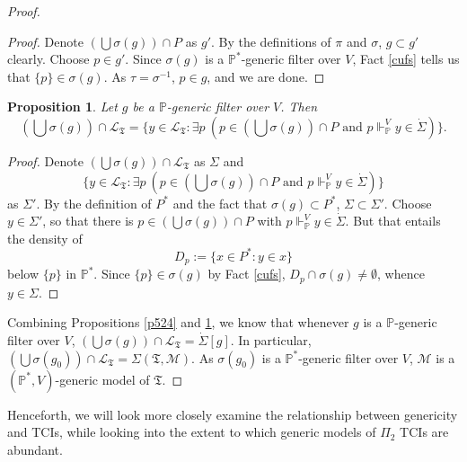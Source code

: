 \documentclass[12pt, twoside]{memoir}
\numberwithin{equation}{section}
\newtheorem{prop}[thm]{Proposition}
\theoremstyle{definition}
\theoremstyle{remark}
\theoremstyle{definition}
\theoremstyle{definition}
\theoremstyle{definition}
\theoremstyle{remark}
\begin{document}
\begin{proof}
\begin{proof}
Denote $(\bigcup \sigma(g)) \cap P$ as $g'$. By the definitions of $\pi$ and $\sigma$, $g \subset g'$ clearly. Choose $p \in g'$. Since $\sigma(g)$ is a $\mathbb{P}^*$-generic filter over $V$, Fact \ref{cufs} tells us that $\{p\} \in \sigma(g)$. As $\tau = \sigma^{-1}$, $p \in g$, and we are done.
\end{proof}

\begin{prop}\label{p525}
Let $g$ be a $\mathbb{P}$-generic filter over $V$. Then $$(\bigcup \sigma(g)) \cap \mathcal{L}_{\mathfrak{T}} = \{y \in \mathcal{L}_{\mathfrak{T}} : \exists p \ (p \in (\bigcup \sigma(g)) \cap P \text{ and } p \Vdash_{\mathbb{P}}^V y \in \dot{\Sigma})\}.$$
\end{prop}

\begin{proof}
Denote $(\bigcup \sigma(g)) \cap \mathcal{L}_{\mathfrak{T}}$ as $\Sigma$ and $$\{y \in \mathcal{L}_{\mathfrak{T}} : \exists p \ (p \in (\bigcup \sigma(g)) \cap P \text{ and } p \Vdash_{\mathbb{P}}^V y \in \dot{\Sigma})\}$$ as $\Sigma'$. By the definition of $P^*$ and the fact that $\sigma(g) \subset P^*$, $\Sigma \subset \Sigma'$. Choose $y \in \Sigma'$, so that there is $p \in (\bigcup \sigma(g)) \cap P$ with $p \Vdash_{\mathbb{P}}^V y \in \dot{\Sigma}$. But that entails the density of $$D_p := \{x \in P^* : y \in x\}$$ below $\{p\}$ in $\mathbb{P}^*$. Since $\{p\} \in \sigma(g)$ by Fact \ref{cufs}, $D_p \cap \sigma(g) \neq \emptyset$, whence $y \in \Sigma$.
\end{proof}

Combining Propositions \ref{p524} and \ref{p525}, we know that whenever $g$ is a $\mathbb{P}$-generic filter over $V$, $(\bigcup \sigma(g)) \cap \mathcal{L}_{\mathfrak{T}} = \dot{\Sigma}[g]$. In particular, $(\bigcup \sigma(g_0)) \cap \mathcal{L}_{\mathfrak{T}} = \Sigma(\mathfrak{T}, \mathcal{M})$. As $\sigma(g_0)$ is a $\mathbb{P}^*$-generic filter over $V$, $\mathcal{M}$ is a $(\mathbb{P}^*, V)$-generic model of $\mathfrak{T}$.
\end{proof}

Henceforth, we will look more closely examine the relationship between genericity and TCIs, while looking into the extent to which generic models of $\Pi_2$ TCIs are abundant. 
\end{document}
